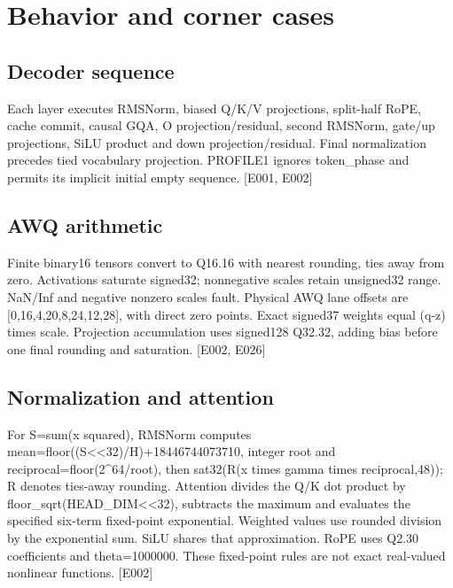 \documentclass[11pt,a4paper]{article}
\begin{document}
\section{Behavior and corner cases}

\subsection{Decoder sequence}

Each layer executes RMSNorm,\allowbreak{} biased Q/\allowbreak{}K/\allowbreak{}V projections,\allowbreak{} split-half RoPE,\allowbreak{} cache commit,\allowbreak{} causal GQA,\allowbreak{} O projection/\allowbreak{}residual,\allowbreak{} second RMSNorm,\allowbreak{} gate/\allowbreak{}up projections,\allowbreak{} SiLU product and down projection/\allowbreak{}residual. Final normalization precedes tied vocabulary projection. PROFILE1 ignores token\_\allowbreak{}phase and permits its implicit initial empty sequence. [\allowbreak{}E001,\allowbreak{} E002]\allowbreak{}

\subsection{AWQ arithmetic}

Finite binary16 tensors convert to Q16.16 with nearest rounding,\allowbreak{} ties away from zero. Activations saturate signed32; nonnegative scales retain unsigned32 range. NaN/\allowbreak{}Inf and negative nonzero scales fault. Physical AWQ lane offsets are [\allowbreak{}0,\allowbreak{}16,\allowbreak{}4,\allowbreak{}20,\allowbreak{}8,\allowbreak{}24,\allowbreak{}12,\allowbreak{}28]\allowbreak{},\allowbreak{} with direct zero points. Exact signed37 weights equal (\allowbreak{}q-z)\allowbreak{} times scale. Projection accumulation uses signed128 Q32.32,\allowbreak{} adding bias before one final rounding and saturation. [\allowbreak{}E002,\allowbreak{} E026]\allowbreak{}

\subsection{Normalization and attention}

For S=\allowbreak{}sum(\allowbreak{}x squared)\allowbreak{},\allowbreak{} RMSNorm computes mean=\allowbreak{}floor(\allowbreak{}(\allowbreak{}S<<32)\allowbreak{}/\allowbreak{}H)\allowbreak{}+\allowbreak{}18446744073710,\allowbreak{} integer root and reciprocal=\allowbreak{}floor(\allowbreak{}2\textasciicircum{}64/\allowbreak{}root)\allowbreak{},\allowbreak{} then sat32(\allowbreak{}R(\allowbreak{}x times gamma times reciprocal,\allowbreak{}48)\allowbreak{})\allowbreak{}; R denotes ties-away rounding. Attention divides the Q/\allowbreak{}K dot product by floor\_\allowbreak{}sqrt(\allowbreak{}HEAD\_\allowbreak{}DIM<<32)\allowbreak{},\allowbreak{} subtracts the maximum and evaluates the specified six-term fixed-point exponential. Weighted values use rounded division by the exponential sum. SiLU shares that approximation. RoPE uses Q2.30 coefficients and theta=\allowbreak{}1000000. These fixed-point rules are not exact real-valued nonlinear functions. [\allowbreak{}E002]\allowbreak{}
\end{document}
